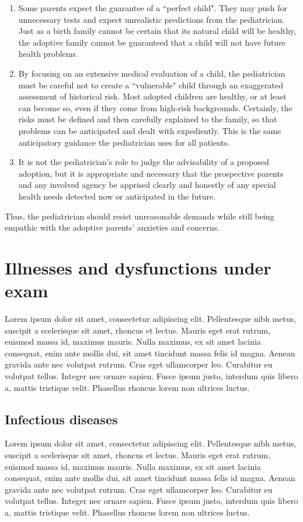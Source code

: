 \begin{enumerate}
    \item Some parents expect the guarantee of a ``perfect child". They may push for unnecessary tests and expect unrealistic predictions from the pediatrician. Just as a birth family cannot be certain that its natural child will be healthy, the adoptive family cannot be guaranteed that a child will not have future health problems.
    \item By focusing on an extensive medical evaluation of a child, the pediatrician must be careful not to create a ``vulnerable" child through an exaggerated assessment of historical risk. Most adopted children are healthy, or at least can become so, even if they come from high-risk backgrounds. Certainly, the risks must be defined and then carefully explained to the family, so that problems can be anticipated and dealt with expediently. This is the same anticipatory guidance the pediatrician uses for all patients.
    \item It is not the pediatrician's role to judge the advisability of a proposed adoption, but it is appropriate and necessary that the prospective parents and any involved agency be apprised clearly and honestly of any special health needs detected now or anticipated in the future.
\end{enumerate}

Thus, the pediatrician should resist unreasonable demands while still being empathic with the adoptive parents' anxieties and concerns.

\section{Illnesses and dysfunctions under exam}\label{sec:illnessesanddysfunctions}
Lorem ipsum dolor sit amet, consectetur adipiscing elit. Pellentesque nibh metus, suscipit a scelerisque sit amet, rhoncus et lectus. Mauris eget erat rutrum, euismod massa id, maximus mauris. Nulla maximus, ex sit amet lacinia consequat, enim ante mollis dui, sit amet tincidunt massa felis id magna. Aenean gravida ante nec volutpat rutrum. Cras eget ullamcorper leo. Curabitur eu volutpat tellus. Integer nec ornare sapien. Fusce ipsum justo, interdum quis libero a, mattis tristique velit. Phasellus rhoncus lorem non ultrices luctus.


\subsection{Infectious diseases}\label{sub:infectiousdiseases}
Lorem ipsum dolor sit amet, consectetur adipiscing elit. Pellentesque nibh metus, suscipit a scelerisque sit amet, rhoncus et lectus. Mauris eget erat rutrum, euismod massa id, maximus mauris. Nulla maximus, ex sit amet lacinia consequat, enim ante mollis dui, sit amet tincidunt massa felis id magna. Aenean gravida ante nec volutpat rutrum. Cras eget ullamcorper leo. Curabitur eu volutpat tellus. Integer nec ornare sapien. Fusce ipsum justo, interdum quis libero a, mattis tristique velit. Phasellus rhoncus lorem non ultrices luctus.

